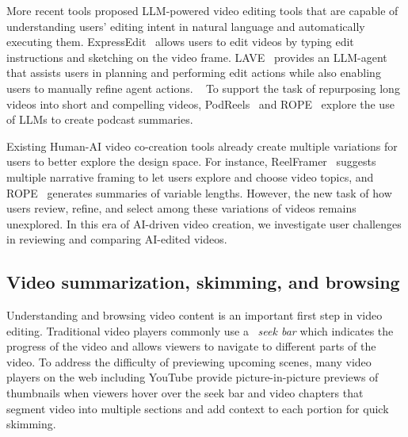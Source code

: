 More recent tools proposed LLM-powered video editing tools that are capable of understanding users' editing intent in natural language and automatically executing them. ExpressEdit~\cite{tilekbay2024expressedit} allows users to edit videos by typing edit instructions and sketching on the video frame.
LAVE~\cite{wang2024lave} provides an LLM-agent that assists users in planning and performing edit actions while also enabling users to manually refine agent actions. \
To support the task of repurposing long videos into short and compelling videos, PodReels~\cite{wang2024podreels} and ROPE~\cite{wang2022record} explore the use of LLMs to create podcast summaries. 

Existing Human-AI video co-creation tools already create multiple variations for users to better explore the design space. For instance, ReelFramer~\cite{wang2024reelframer} suggests multiple narrative framing to let users explore and choose video topics, and ROPE~\cite{wang2022record} generates summaries of variable lengths. However, the new task of how users review, refine, and select among these variations of videos remains unexplored. 
In this era of AI-driven video creation, we investigate user challenges in reviewing and comparing AI-edited videos.


\subsection{Video summarization, skimming, and browsing}

Understanding and browsing video content is an important first step in video editing. Traditional video players commonly use a ~\textit{seek bar} which indicates the progress of the video and allows viewers to navigate to different parts of the video. To address the difficulty of previewing upcoming scenes, many video players on the web including YouTube provide picture-in-picture previews of thumbnails when viewers hover over the seek bar and video chapters that segment video into multiple sections and add context to each portion for quick skimming.

